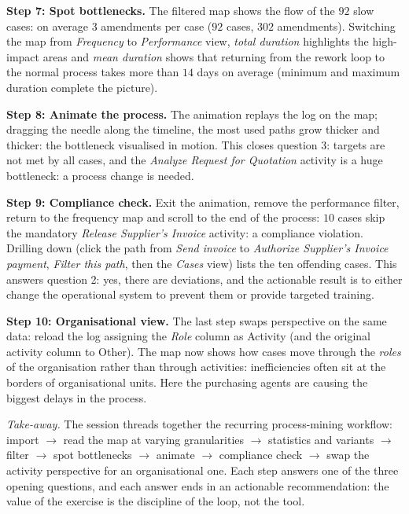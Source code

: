 \textbf{Step 7: Spot bottlenecks.} The filtered map shows the flow of the $92$ slow cases: on average $3$ amendments per case ($92$ cases, $302$ amendments). Switching the map from \emph{Frequency} to \emph{Performance} view, \emph{total duration} highlights the high-impact areas and \emph{mean duration} shows that returning from the rework loop to the normal process takes more than $14$ days on average (minimum and maximum duration complete the picture).

\textbf{Step 8: Animate the process.} The animation replays the log on the map; dragging the needle along the timeline, the most used paths grow thicker and thicker: the bottleneck visualised in motion. This closes question 3: targets are not met by all cases, and the \emph{Analyze Request for Quotation} activity is a huge bottleneck: a process change is needed.

\textbf{Step 9: Compliance check.} Exit the animation, remove the performance filter, return to the frequency map and scroll to the end of the process: $10$ cases skip the mandatory \emph{Release Supplier's Invoice} activity: a compliance violation. Drilling down (click the path from \emph{Send invoice} to \emph{Authorize Supplier's Invoice payment}, \emph{Filter this path}, then the \emph{Cases} view) lists the ten offending cases. This answers question 2: yes, there are deviations, and the actionable result is to either change the operational system to prevent them or provide targeted training.

\textbf{Step 10: Organisational view.} The last step swaps perspective on the same data: reload the log assigning the \emph{Role} column as Activity (and the original activity column to Other). The map now shows how cases move through the \emph{roles} of the organisation rather than through activities: inefficiencies often sit at the borders of organisational units. Here the purchasing agents are causing the biggest delays in the process.

\medskip
\noindent\emph{Take-away.} The session threads together the recurring process-mining workflow: import $\to$ read the map at varying granularities $\to$ statistics and variants $\to$ filter $\to$ spot bottlenecks $\to$ animate $\to$ compliance check $\to$ swap the activity perspective for an organisational one. Each step answers one of the three opening questions, and each answer ends in an actionable recommendation: the value of the exercise is the discipline of the loop, not the tool.


